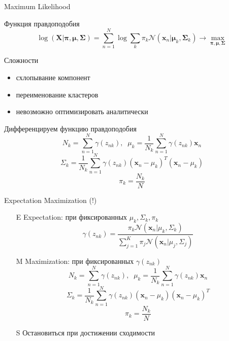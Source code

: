 \documentclass[aspectratio=169]{beamer}
\begin{document}
\begin{frame}{Maximum Likelihood}

Функция правдоподобия
\[
\log(\mathbf{X} | \mathbf{\pi}, \mathbf{\mu}, \mathbf{\Sigma}) = \sum_{n=1}^N \log \sum_k \pi_k \mathcal{N}(\mathbf{x}_n | \mathbf{\mu}_k, \mathbf{\Sigma}_k) \rightarrow \max_{\mathbf{\pi}, \mathbf{\mu}, \mathbf{\Sigma}}
\]

Сложности
\begin{itemize}
\item схлопывание компонент
\item переименование кластеров
\item невозможно оптимизировать аналитически
\end{itemize}

\end{frame}

\begin{frame}{}

Дифференцируем функцию правдоподобия
\[
N_k = \sum_{n=1}^N \gamma(z_{nk}), \;\; \mu_k = \frac 1 {N_k} \sum_{n=1}^N \gamma(z_{nk}) \mathbf{x}_n
\]
\[
\Sigma_k = \frac 1 {N_k} \sum_{n=1}^N \gamma(z_{nk}) (\mathbf{x}_n - \mu_k)^T (\mathbf{x}_n - \mu_k)
\]
\[
\pi_k = \frac{N_k}{N}
\]

\end{frame}

\begin{frame}{Expectation Maximization (!)}

\begin{enumerate}
\item[E] Expectation: при фиксированных $\mu_k, \Sigma_k, \pi_k$
\[
\gamma(z_{nk}) = \frac{\pi_k \mathcal{N} (\mathbf{x}_n | \mu_k, \Sigma_k)}{\sum_{j=1}^K \pi_j \mathcal{N} (\mathbf{x}_n | \mu_j, \Sigma_j)}
\]
\item[M] Maximization: при фиксированных $\gamma(z_{nk})$
\[
N_k = \sum_{n=1}^N \gamma(z_{nk}), \;\; \mu_k = \frac 1 {N_k} \sum_{n=1}^N \gamma(z_{nk}) \mathbf{x}_n
\]
\[
\Sigma_k = \frac 1 {N_k} \sum_{n=1}^N \gamma(z_{nk}) (\mathbf{x}_n - \mu_k)(\mathbf{x}_n - \mu_k)^T
\]
\[
\pi_k = \frac{N_k}{N}
\]
\item[S] Остановиться при достижении сходимости
\end{enumerate}

\end{frame}
\end{document}
